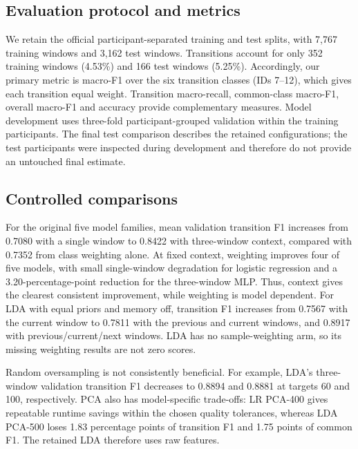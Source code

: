 
\subsection{Evaluation protocol and metrics}
We retain the official participant-separated training and test splits, with
7,767 training windows and 3,162 test windows. Transitions account for only
352 training windows (4.53\%) and 166 test windows (5.25\%). Accordingly,
our primary metric is macro-F1 over the six transition classes (IDs 7--12),
which gives each transition equal weight. Transition macro-recall, common-class
macro-F1, overall macro-F1 and accuracy provide complementary measures.
Model development uses three-fold participant-grouped validation within the
training participants. The final test comparison describes the retained
configurations; the test participants were inspected during development and
therefore do not provide an untouched final estimate.

\subsection{Controlled comparisons}
For the original five model families, mean validation transition F1 increases
from 0.7080 with a single window to 0.8422 with three-window context, compared
with 0.7352 from class weighting alone. At fixed context, weighting improves
four of five models, with small single-window degradation for logistic
regression and a 3.20-percentage-point reduction for the three-window MLP.
Thus, context gives the clearest consistent improvement, while weighting is
model dependent. For LDA with equal priors and memory off, transition F1
increases from 0.7567 with the current window to 0.7811 with the previous
and current windows, and 0.8917 with previous/current/next windows.
LDA has no sample-weighting arm, so its missing weighting results are not
zero scores.

Random oversampling is not consistently beneficial. For example, LDA's
three-window validation transition F1 decreases to 0.8894 and 0.8881 at
targets 60 and 100, respectively. PCA also has model-specific trade-offs:
LR PCA-400 gives repeatable runtime savings within the chosen quality
tolerances, whereas LDA PCA-500 loses 1.83 percentage points of transition
F1 and 1.75 points of common F1. The retained LDA therefore uses raw features.

